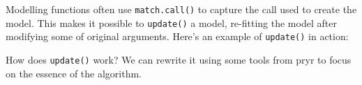 \begin{Shaded}
\begin{Highlighting}[]
\StringTok{ } \NormalTok{, } \NormalTok{, } \NormalTok{) \{}
  \NormalTok{(} \NormalTok{(), } \NormalTok{())}
\NormalTok{\}}
\NormalTok{(} \NormalTok{, }\NormalTok{)}
\CommentTok{#> }
\end{Highlighting}
\end{Shaded}

Modelling functions often use \texttt{match.call()} to capture the call
used to create the model. This makes it possible to \texttt{update()} a
model, re-fitting the model after modifying some of original arguments.
Here's an example of \texttt{update()} in action: 

\begin{Shaded}
\begin{Highlighting}[]
\StringTok{ }\StringTok{ } 
 \StringTok{ }\StringTok{ }
\CommentTok{#> }
\CommentTok{#> }
\end{Highlighting}
\end{Shaded}

How does \texttt{update()} work? We can rewrite it using some tools from
pryr to focus on the essence of the algorithm.


